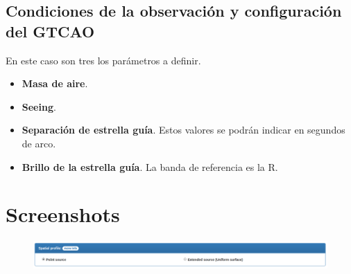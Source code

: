 \subsection{Condiciones de la observaci\'on y configuraci\'on del GTCAO}
En este caso son tres los par\'ametros a definir.
    \begin{itemize}
        \item \textbf{Masa de aire}.
        \item \textbf{Seeing}.
        \item \textbf{Separaci\'on de estrella gu\'ia}. Estos valores se podr\'an indicar en segundos de arco.
        \item \textbf{Brillo de la estrella gu\'ia}. La banda de referencia es la R.
    \end{itemize}

\section{Screenshots}

\begin{figure}[h]
    \centering
    \includegraphics[scale=0.25]{figs/spatial-profile}
    \label{fig:spatial}
\end{figure}

